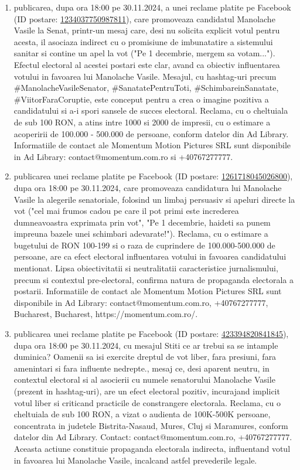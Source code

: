 \documentclass[a4paper,12pt]{article}
\begin{document}
\begin{enumerate}[leftmargin=*, label=\arabic*.)]
    \item publicarea, dupa ora 18:00 pe 30.11.2024, a unei reclame platite pe Facebook (ID postare: \href{https://www.facebook.com/ads/library/?id=1234037750987811}{1234037750987811}), care promoveaza candidatul Manolache Vasile la Senat,  printr-un mesaj care, desi nu solicita explicit votul pentru acesta,  il asociaza indirect cu o promisiune de imbunatatire a sistemului sanitar si contine un apel la vot ("Pe 1 decembrie, mergem sa votam...").  Efectul electoral al acestei postari este clar, avand ca obiectiv influentarea votului in favoarea lui Manolache Vasile.  Mesajul,  cu hashtag-uri precum \#ManolacheVasileSenator, \#SanatatePentruToti,  \#SchimbareinSanatate, \#ViitorFaraCoruptie,  este conceput pentru a crea o imagine pozitiva a candidatului si a-i spori sansele de succes electoral.  Reclama, cu o cheltuiala de sub 100 RON, a atins intre 1000 si 2000 de impresii, cu o estimare a acoperirii de 100.000 - 500.000 de persoane, conform datelor din Ad Library.  Informatiile de contact ale Momentum Motion Pictures SRL sunt disponibile in Ad Library: contact@momentum.com.ro si +40767277777.
    \item publicarea unei reclame platite pe Facebook (ID postare: \href{https://www.facebook.com/ads/library/?id=1261718045026800}{1261718045026800}), dupa ora 18:00 pe 30.11.2024, care promoveaza candidatura lui Manolache Vasile la alegerile senatoriale, folosind un limbaj persuasiv si apeluri directe la vot ("cel mai frumos cadou pe care il pot primi este increderea dumneavoastra exprimata prin vot", "Pe 1 decembrie, haideti sa punem impreuna bazele unei schimbari adevarate!").  Reclama, cu o estimare a bugetului de RON 100-199 si o raza de cuprindere de 100.000-500.000 de persoane, are ca efect electoral influentarea votului in favoarea candidatului mentionat.  Lipsa obiectivitatii si neutralitatii caracteristice jurnalismului, precum si contextul pre-electoral, confirma natura de propaganda electorala a postarii.  Informatiile de contact ale Momentum Motion Pictures SRL sunt disponibile in Ad Library: contact@momentum.com.ro, +40767277777, Bucharest, Bucharest, https://momentum.com.ro/.
    \item publicarea unei reclame platite pe Facebook (ID postare: \href{https://www.facebook.com/ads/library/?id=423394820841845}{423394820841845}), dupa ora 18:00 pe 30.11.2024, cu mesajul  Stiti ce ar trebui sa se intample duminica? Oamenii sa isi exercite dreptul de vot liber, fara presiuni, fara amenintari si fara influente nedrepte.,  mesaj ce, desi aparent neutru,  in contextul electoral si al asocierii cu numele senatorului Manolache Vasile (prezent in hashtag-uri), are un efect electoral pozitiv,  incurajand implicit votul liber si criticand practicile de constrangere electorala.  Reclama, cu o cheltuiala de sub 100 RON, a vizat o audienta de 100K-500K persoane, concentrata in judetele Bistrita-Nasaud, Mures, Cluj si Maramures, conform datelor din Ad Library.  Contact: contact@momentum.com.ro, +40767277777.  Aceasta actiune constituie propaganda electorala indirecta, influentand votul in favoarea lui Manolache Vasile, incalcand astfel prevederile legale.

\end{enumerate}
\end{document}
